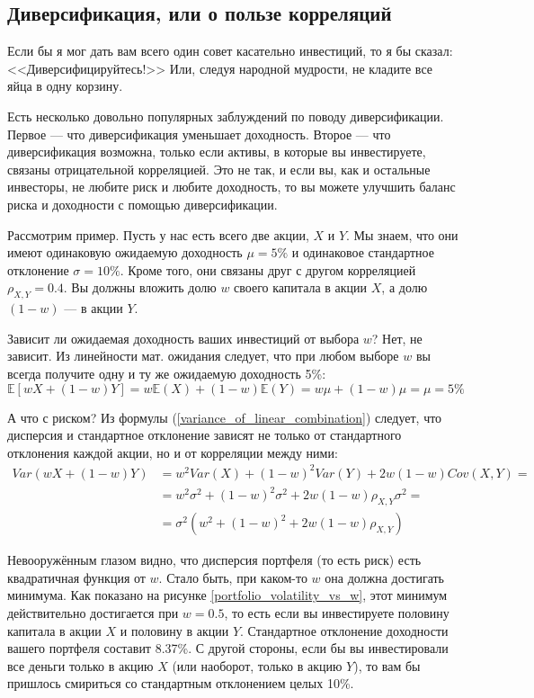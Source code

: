 \subsection{Диверсификация, или о пользе корреляций}

Если бы я мог дать вам всего один совет касательно инвестиций, то я бы сказал: 
<<Диверсифицируйтесь!>> Или, следуя народной мудрости, не кладите все яйца в 
одну корзину. 

Есть несколько довольно популярных заблуждений по поводу диверсификации. Первое 
--- что диверсификация уменьшает доходность. Второе --- что диверсификация 
возможна, только если активы, в которые вы инвестируете, связаны отрицательной 
корреляцией. Это не так, и если вы, как и остальные инвесторы, не любите риск и 
любите доходность, то вы можете улучшить баланс риска и доходности с помощью 
диверсификации.

Рассмотрим пример. Пусть у нас есть всего две акции, $X$ и $Y$. Мы знаем, что 
они имеют одинаковую ожидаемую доходность $\mu=5\%$ и одинаковое стандартное 
отклонение $\sigma=10\%$. Кроме того, они связаны друг с другом корреляцией
$\rho_{X,Y} = 0.4$. Вы должны вложить долю $w$ своего капитала в акции $X$, а 
долю $(1-w)$ --- в акции $Y$.

Зависит ли ожидаемая доходность ваших инвестиций от выбора $w$? Нет, не зависит. 
Из линейности мат. ожидания следует, что при любом выборе $w$ вы всегда получите 
одну и ту же ожидаемую доходность 5\%:
\begin{equation*}
\mathbb{E}\left[ wX + (1-w)Y\right] =
w\mathbb{E}(X) + (1-w)\mathbb{E}(Y) = w\mu + (1-w)\mu = \mu = 5\%
\end{equation*}

А что с риском? Из формулы (\ref{variance_of_linear_combination}) следует, что 
дисперсия и стандартное отклонение зависят не только от стандартного отклонения 
каждой акции, но и от корреляции между ними:
\begin{align*}
Var(wX + (1-w)Y)
&= w^2Var(X) + (1-w)^2Var(Y) + 2w(1-w)Cov(X,Y) = \\
&= w^2\sigma^2 + (1-w)^2\sigma^2 + 2w(1-w)\rho_{X,Y}\sigma^2 = \\
&= \sigma^2\left(w^2 + (1-w)^2 + 2w(1-w)\rho_{X,Y} \right)
\end{align*}

Невооружённым глазом видно, что дисперсия портфеля (то есть риск) есть 
квадратичная функция от $w$. Стало быть, при каком-то $w$ она должна достигать 
минимума. Как показано на рисунке \ref{portfolio_volatility_vs_w}, этот минимум 
действительно достигается при $w=0.5$, то есть если вы инвестируете половину 
капитала в акции $X$ и половину в акции $Y$. Стандартное отклонение доходности 
вашего портфеля составит 8.37\%. С другой стороны, если бы вы инвестировали все 
деньги только в акцию $X$ (или наоборот, только в акцию $Y$), то вам бы пришлось 
смириться со стандартным отклонением целых 10\%.

